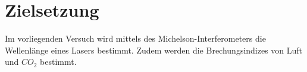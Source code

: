 \section{Zielsetzung}
\label{sec:Zielsetzung}
Im vorliegenden Versuch wird mittels des Michelson-Interferometers die Wellenlänge eines Lasers bestimmt. Zudem werden die Brechungsindizes von Luft und $CO_2$ bestimmt.
